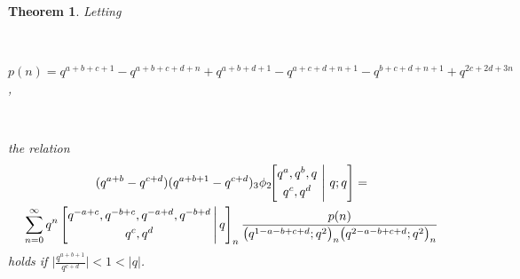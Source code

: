 \documentclass[10pt,a4paper]{amsart}
\newtheorem{theorem}{Theorem}
\begin{document}
\begin{theorem}\label{theoremquarter}
 Letting

 \ 
 
\noindent $ p(n) = q^{a+b+c+1}-q^{a+b+c+d+n} + q^{a+b+d+1} -  q^{a+c+d+n+1}-q^{b+c+d+n+1}+q^{2 c+2 d+3 n}$, 

 \ 

\noindent the relation 
\begin{multline*}
 (q^{a+b} - q^{c+d}) (q^{a+b+1} - q^{c+d}) 
 {}_{3}\phi_{2}\!\!\left[ \begin{matrix} 
 q^{a}, q^{b}, q \vspace{1mm}\\ 
 q^{c}, q^{d} \end{matrix} \ \Bigg| \ q; q 
 \right] = \\ 
 \sum_{n=0}^{\infty} q^{n} 
 \left[ \begin{matrix} 
 q^{-a+c}, q^{-b+c}, q^{-a+d}, q^{-b+d} \vspace{1mm} \\ 
 q^{c}, q^{d} \end{matrix} \, \Bigg| \, q \right]_{n} 
 \frac{p(n)}{ 
 \big( q^{1-a-b+c+d};q^2 \big)_{n} \big( q^{2-a-b+c+d};q^2 \big)_{n} }
 \end{multline*}
 holds if $\big| \frac{q^{a + b + 1}}{q^{c + d}} \big| < 1 < |q|$. 
\end{theorem} 
\end{document}
